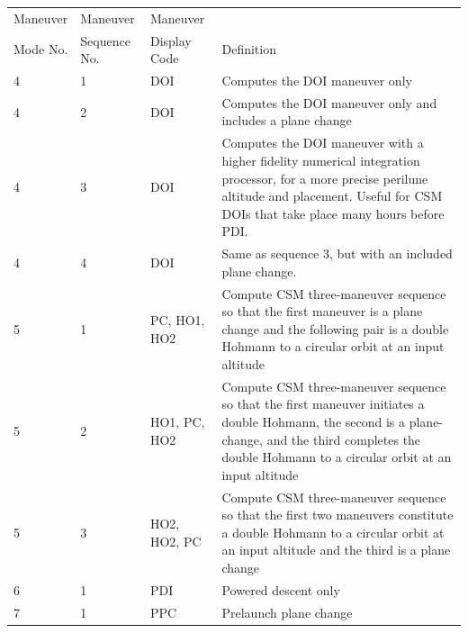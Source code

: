 \documentclass[11pt]{article} %
\begin{document}
\newpage
\begin{center}
\begin{tabular}{l l l m{7.3cm}}
Maneuver&Maneuver&Maneuver&\\
Mode No.&Sequence No.&Display Code& Definition\\
\hline
4&1&DOI&Computes the DOI maneuver only\\
\hline
4&2&DOI&Computes the DOI maneuver only and includes a plane change\\
\hline
4&3&DOI&Computes the DOI maneuver with a higher fidelity numerical integration processor, for a more precise perilune altitude and placement. Useful for CSM DOIs that take place many hours before PDI.\\
\hline
4&4&DOI&Same as sequence 3, but with an included plane change.\\
\hline
5&1&PC, HO1, HO2&Compute CSM three-maneuver sequence so that the first maneuver is a plane change and the following pair is a double Hohmann to a circular orbit at an input altitude\\
\hline
5&2&HO1, PC, HO2&Compute CSM three-maneuver sequence so that the first maneuver initiates a double Hohmann, the second is a plane-change, and the third completes  the double Hohmann to a circular orbit at an input altitude\\
\hline
5&3&HO2, HO2, PC&Compute CSM three-maneuver sequence so that the first two maneuvers constitute a double Hohmann to a circular orbit at an input altitude and the third is a plane change\\
\hline
6&1&PDI&Powered descent only\\
\hline
7&1&PPC&Prelaunch plane change\\
\hline
\end{tabular}
\end{center}
\newpage
\end{document}
